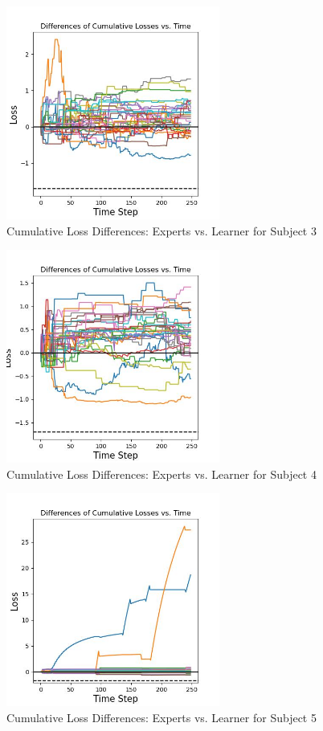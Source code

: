 \begin{figure}[h!]
    \centering
    \includegraphics[width=0.625\textwidth]{images/HA_differences.jpg}
    \caption{Cumulative Loss Differences: Experts vs. Learner for Subject 3}
\end{figure}
\begin{figure}[ht]
    \centering
    \includegraphics[width=0.625\textwidth]{images/ME_differences.jpg}
    \caption{Cumulative Loss Differences: Experts vs. Learner for Subject 4}
\end{figure}
\begin{figure}[h!]
    \centering
    \includegraphics[width=0.625\textwidth]{images/NJ_differences.jpg}
    \caption{Cumulative Loss Differences: Experts vs. Learner for Subject 5}
\end{figure}
